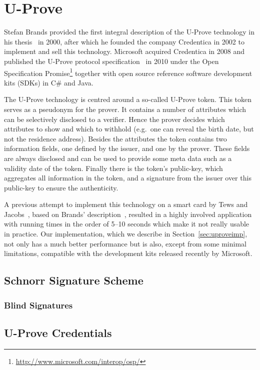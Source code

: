 \chapter{U-Prove}

Stefan Brands provided the first integral description of the U-Prove
technology in his thesis~\cite{Brands2000} in 2000, after which he founded
the company Credentica in 2002 to implement and sell this technology.
Microsoft acquired Credentica in 2008 and published the U-Prove protocol
specification~\cite{U-Prove_Crypto2010} in 2010 under the Open
Specification
Promise\footnote{\url{http://www.microsoft.com/interop/osp/}} together with
open source reference software development kits (SDKs) in C\# and Java.

The U-Prove technology is centred around a so-called U-Prove token. This
token serves as a pseudonym for the prover. It contains a number of
attributes which can be selectively disclosed to a verifier. Hence the
prover decides which attributes to show and which to withhold (e.g.\ one
can reveal the birth date, but not the residence address). Besides the
attributes the token contains two information fields, one defined by the
issuer, and one by the prover. These fields are always disclosed and can be
used to provide some meta data such as a validity date of the token.
Finally there is the token's public-key, which aggregates all information
in the token, and a signature from the issuer over this public-key to
ensure the authenticity.

A previous attempt to implement this technology on a smart card by Tews and
Jacobs~\cite{TewsJacobs09}, based on Brands' description~\cite{Brands2000},
resulted in a highly involved application with running times in the order
of 5--10 seconds which make it not really usable in practice. Our
implementation, which we describe in Section~\ref{sec:uproveimp}, not only
has a much better performance but is also, except from some minimal
limitations, compatible with the development kits released recently by
Microsoft.

\section{Schnorr Signature Scheme}

\subsection{Blind Signatures}

\section{U-Prove Credentials}

